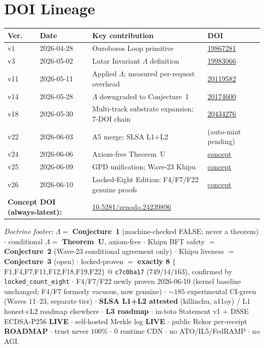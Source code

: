 \documentclass[11pt,letterpaper]{article}
\theoremstyle{definition}
\newcommand{\Lam}{\Lambda}
\begin{document}
\section{DOI Lineage}
\label{app:doi}

\begin{center}\small
\begin{tabular}{@{}p{0.7cm}p{2.2cm}p{6.0cm}p{2.0cm}@{}}
\toprule
\textbf{Ver.} & \textbf{Date} & \textbf{Key contribution} & \textbf{DOI} \\
\midrule
v1  & 2026-04-28 & Ouroboros Loop primitive
    & \href{https://doi.org/10.5281/zenodo.19867281}{19867281} \\
v3  & 2026-05-02 & Lutar Invariant $\Lam$ definition
    & \href{https://doi.org/10.5281/zenodo.19983066}{19983066} \\
v11 & 2026-05-11 & Applied $\Lam$; measured per-request overhead
    & \href{https://doi.org/10.5281/zenodo.20119582}{20119582} \\
v14 & 2026-05-28 & $\Lam$ downgraded to Conjecture~1
    & \href{https://doi.org/10.5281/zenodo.20174600}{20174600} \\
v18 & 2026-05-30 & Multi-track substrate expansion; 7-DOI chain
    & \href{https://doi.org/10.5281/zenodo.20434276}{20434276} \\
v22 & 2026-06-03 & A5 merge; SLSA L1+L2
    & (auto-mint pending) \\
v24 & 2026-06-06 & Axiom-free Theorem~U
    & \href{https://doi.org/10.5281/zenodo.24239896}{concept} \\
v25 & 2026-06-09 & GPD unification; Wave-23 Khipu
    & \href{https://doi.org/10.5281/zenodo.24239896}{concept} \\
v26 & 2026-06-10 & Locked-Eight Edition: F4/F7/F22 genuine proofs
    & \href{https://doi.org/10.5281/zenodo.24239896}{concept} \\
\midrule
\multicolumn{2}{l}{\textbf{Concept DOI (always-latest):}}
  & \multicolumn{2}{l}{%
    \href{https://doi.org/10.5281/zenodo.24239896}{10.5281/zenodo.24239896}
    \cite{szl_concept}} \\
\bottomrule
\end{tabular}
\end{center}

\bigskip
\noindent\emph{Doctrine footer:}
$\Lam =$ \textbf{Conjecture~1} (machine-checked FALSE; never a theorem) $\cdot$
conditional $\Lam =$ \textbf{Theorem~U}, axiom-free $\cdot$
Khipu BFT safety $=$ \textbf{Conjecture~2} (Wave-23 conditional agreement only) $\cdot$
Khipu liveness $=$ \textbf{Conjecture~3} (open) $\cdot$
locked-proven $=$ \textbf{exactly 8}
$\{$F1,F4,F7,F11,F12,F18,F19,F22$\}$ @ \texttt{c7c0ba17} ($749/14/163$),
confirmed by \texttt{locked\_count\_eight} $\cdot$
F4/F7/F22 newly proven 2026-06-10 (kernel baseline unchanged;
F4/F7 formerly vacuous, now genuine) $\cdot$
${\sim}185$ experimental CI-green (Waves 11--23, separate tier) $\cdot$
\textbf{SLSA L1+L2 attested} (killinchu, a11oy) / L1 honest+L2 roadmap elsewhere $\cdot$
\textbf{L3 roadmap} $\cdot$
in-toto Statement v1 + DSSE ECDSA-P256 \textbf{LIVE} $\cdot$
self-hosted Merkle log \textbf{LIVE} $\cdot$
public Rekor per-receipt \textbf{ROADMAP} $\cdot$
trust never $100\%$ $\cdot$ 0 runtime CDN $\cdot$ no ATO/IL5/FedRAMP $\cdot$ no AGI.
\end{document}

